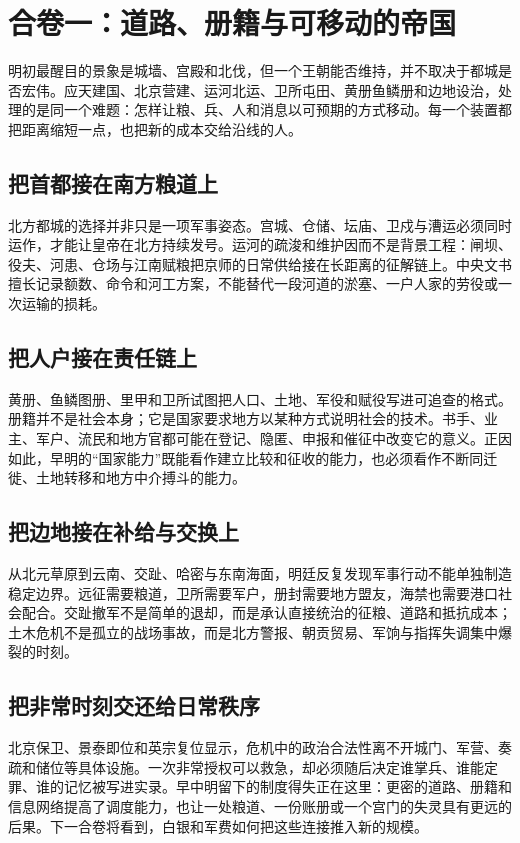 \chapter{合卷一：道路、册籍与可移动的帝国}
\label{ch:ming-synthesis-movement}

明初最醒目的景象是城墙、宫殿和北伐，但一个王朝能否维持，并不取决于都城是否宏伟。应天建国、北京营建、运河北运、卫所屯田、黄册鱼鳞册和边地设治，处理的是同一个难题：怎样让粮、兵、人和消息以可预期的方式移动。每一个装置都把距离缩短一点，也把新的成本交给沿线的人。

\section{把首都接在南方粮道上}

北方都城的选择并非只是一项军事姿态。宫城、仓储、坛庙、卫戍与漕运必须同时运作，才能让皇帝在北方持续发号。运河的疏浚和维护因而不是背景工程：闸坝、役夫、河患、仓场与江南赋粮把京师的日常供给接在长距离的征解链上。中央文书擅长记录额数、命令和河工方案，不能替代一段河道的淤塞、一户人家的劳役或一次运输的损耗。

\section{把人户接在责任链上}

黄册、鱼鳞图册、里甲和卫所试图把人口、土地、军役和赋役写进可追查的格式。册籍并不是社会本身；它是国家要求地方以某种方式说明社会的技术。书手、业主、军户、流民和地方官都可能在登记、隐匿、申报和催征中改变它的意义。正因如此，早明的“国家能力”既能看作建立比较和征收的能力，也必须看作不断同迁徙、土地转移和地方中介搏斗的能力。

\section{把边地接在补给与交换上}

从北元草原到云南、交趾、哈密与东南海面，明廷反复发现军事行动不能单独制造稳定边界。远征需要粮道，卫所需要军户，册封需要地方盟友，海禁也需要港口社会配合。交趾撤军不是简单的退却，而是承认直接统治的征粮、道路和抵抗成本；土木危机不是孤立的战场事故，而是北方警报、朝贡贸易、军饷与指挥失调集中爆裂的时刻。

\section{把非常时刻交还给日常秩序}

北京保卫、景泰即位和英宗复位显示，危机中的政治合法性离不开城门、军营、奏疏和储位等具体设施。一次非常授权可以救急，却必须随后决定谁掌兵、谁能定罪、谁的记忆被写进实录。早中明留下的制度得失正在这里：更密的道路、册籍和信息网络提高了调度能力，也让一处粮道、一份账册或一个宫门的失灵具有更远的后果。下一合卷将看到，白银和军费如何把这些连接推入新的规模。
